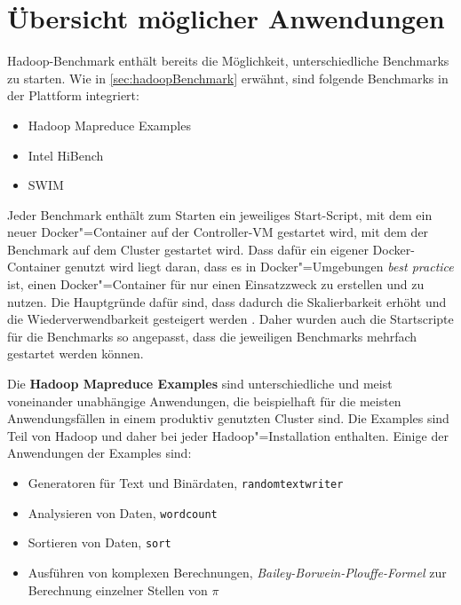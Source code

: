 \section{Übersicht möglicher Anwendungen}\label{sec:appOverview}

Hadoop-Benchmark enthält bereits die Möglichkeit, unterschiedliche Benchmarks zu starten. Wie in \autoref{sec:hadoopBenchmark} erwähnt, sind folgende Benchmarks in der Plattform integriert:

\begin{itemize}
    \item Hadoop Mapreduce Examples
    \item Intel HiBench
    \item \ac{SWIM}
\end{itemize}

Jeder Benchmark enthält zum Starten ein jeweiliges Start-Script, mit dem ein neuer Docker"=Container auf der Controller-VM gestartet wird, mit dem der Benchmark auf dem Cluster gestartet wird. Dass dafür ein eigener Docker-Container genutzt wird liegt daran, dass es in Docker"=Umgebungen \emph{best practice} ist, einen Docker"=Container für nur einen Einsatzzweck zu erstellen und zu nutzen. Die Hauptgründe dafür sind, dass dadurch die Skalierbarkeit erhöht und die Wiederverwendbarkeit gesteigert werden \cite{DockerBestPractice}. Daher wurden auch die Startscripte für die Benchmarks so angepasst, dass die jeweiligen Benchmarks mehrfach gestartet werden können.

Die \textbf{Hadoop Mapreduce Examples} sind unterschiedliche und meist voneinander unabhängige Anwendungen, die beispielhaft für die meisten Anwendungsfällen in einem produktiv genutzten Cluster sind. Die Examples sind Teil von Hadoop und daher bei jeder Hadoop"=Installation enthalten. Einige der Anwendungen der Examples sind:

\begin{itemize}
    \item Generatoren für Text und Binärdaten, \zB \texttt{randomtextwriter}
    \item Analysieren von Daten, \zB \texttt{wordcount}
    \item Sortieren von Daten, \zB \texttt{sort}
    \item Ausführen von komplexen Berechnungen, \zB \emph{Bailey-Borwein-Plouffe-Formel} zur Berechnung einzelner Stellen von $\pi$
\end{itemize}

